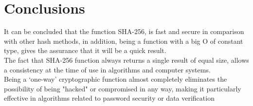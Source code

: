 \documentclass[journal]{IEEEtran}
\begin{document}
\section{Conclusions}
It can be concluded that the function SHA-256, is fast and secure in comparison with other hash methods, in addition, being a function with a big O of constant type, gives the assurance that it will be a quick result.\\The fact that SHA-256 function always returns a single result of equal size, allows a consistency at the time of use in algorithms and computer systems.\\ Being a ‘one-way’ cryptographic function almost completely eliminates the possibility of being "hacked" or compromised in any way, making it particularly effective in algorithms related to password security or data verification
\end{document}
